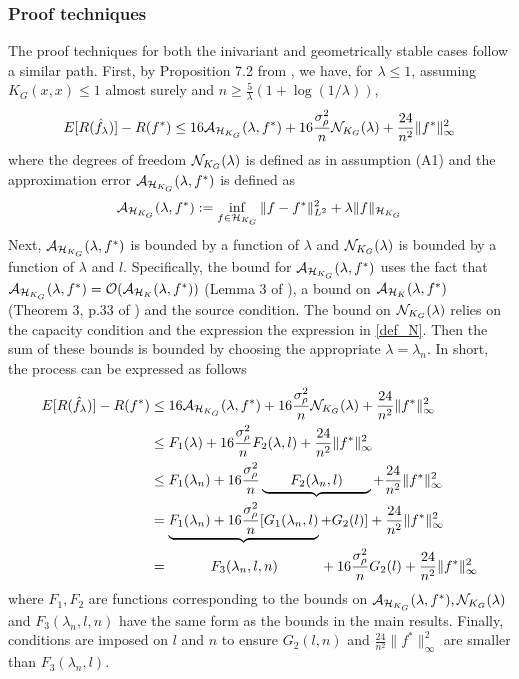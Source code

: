 \subsubsection{Proof techniques}
The proof techniques for both the inivariant and geometrically stable cases follow a similar path. First, by Proposition 7.2 from \cite{bach2021learning}, we have, for $\lambda\le 1$, assuming $K_G(x, x) \le 1$ almost surely and $n \ge \frac{5}{\lambda}(1 + \log(1/\lambda))$,
\begin{align}
    E[R(\hat{f}_\lambda)]-R(f^*)\le 16\mathcal{A}_{\mathcal{H}_{K_G}}(\lambda,f^*) + 16\frac{\sigma^2_\rho}{n}\mathcal{N}_{K_G}(\lambda)+\frac{24}{n^2}\|f^*\|^2_\infty
\end{align}
where the degrees of freedom $\mathcal{N}_{K_G}(\lambda)$ is defined as in assumption (A1) and the approximation error $\mathcal{A}_{\mathcal{H}_{K_G}}(\lambda,f^*)$ is defined as
\begin{align}
    \mathcal{A}_{\mathcal{H}_{K_G}}(\lambda,f^*) := \inf_{f\in \mathcal{H}_{K_G}}\|f-f^*\|^2_{L^2}+\lambda\|f\|_{\mathcal{H}_{K_G}}
\end{align}
Next, $\mathcal{A}_{\mathcal{H}_{K_G}}(\lambda,f^*)$ is bounded by a function of $\lambda$ and $\mathcal{N}_{K_G}(\lambda)$ is bounded by a function of $\lambda$ and $l$. Specifically, the bound for $\mathcal{A}_{\mathcal{H}_{K_G}}(\lambda,f^*)$ uses the fact that $\mathcal{A}_{\mathcal{H}_{K_G}}(\lambda,f^*)=\mathcal{O}(\mathcal{A}_{\mathcal{H}_{K}}(\lambda,f^*))$ (Lemma 3 of \cite{bietti2021sample}), a bound on $\mathcal{A}_{\mathcal{H}_{K}}(\lambda,f^*)$ (Theorem 3, p.33 of \cite{cucker2002mathematical}) and the source condition. The bound on $\mathcal{N}_{K_G}(\lambda)$ relies on the capacity condition and the expression the expression in \eqref{def_N}. Then the sum of these bounds is bounded by choosing the appropriate $\lambda=\lambda_n$. In short, the process can be expressed as follows
\begin{align*}
    E[R(\hat{f}_\lambda)]-R(f^*)&\le 16\mathcal{A}_{\mathcal{H}_{K_G}}(\lambda,f^*) + 16\frac{\sigma^2_\rho}{n}\mathcal{N}_{K_G}(\lambda)+\frac{24}{n^2}\|f^*\|^2_\infty\\
    &\le F_1(\lambda) + 16\frac{\sigma^2_\rho}{n}F_2(\lambda,l) + \frac{24}{n^2}\|f^*\|^2_\infty\\
    &\le F_1(\lambda_n) + 16\frac{\sigma^2_\rho}{n}\underbrace{\qquad F_2(\lambda_n,l)\qquad} + \frac{24}{n^2}\|f^*\|^2_\infty\\
    &= \underbrace{F_1(\lambda_n) + 16\frac{\sigma^2_\rho}{n}[G_1(\lambda_n,l)} + G_2(l)] + \frac{24}{n^2}\|f^*\|^2_\infty\\
    &=\quad\qquad F_3(\lambda_n,l,n) \quad\qquad + 16\frac{\sigma^2_\rho}{n}G_2(l) + \frac{24}{n^2}\|f^*\|^2_\infty
\end{align*}
where $F_1,F_2$ are functions corresponding to the bounds on $\mathcal{A}_{\mathcal{H}_{K_G}}(\lambda,f^*),\mathcal{N}_{K_G}(\lambda)$ and $F_3(\lambda_n,l,n)$ have the same form as the bounds in the main results. Finally, conditions are imposed on $l$ and $n$ to ensure $G_2(l,n)$ and $\frac{24}{n^2}\|f^*\|^2_\infty$ are smaller than $F_3(\lambda_n,l)$.\\


